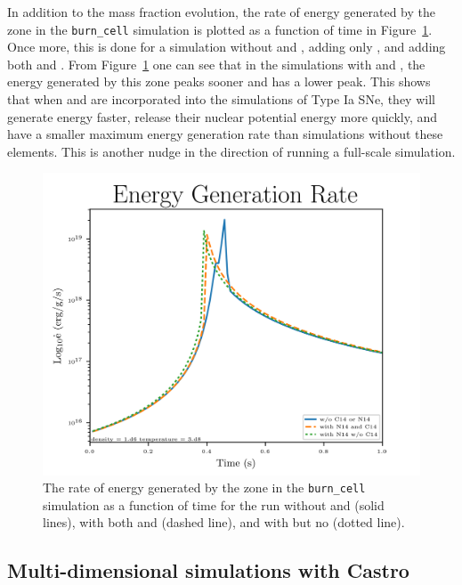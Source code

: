 \documentclass[preprint]{aastex62}
\begin{document}
      In addition to the mass fraction evolution, the rate of energy generated by the zone in the {\tt burn\_cell} simulation is plotted as a function of time in Figure~\ref{fig:energygeneration}. Once more, this is done for a simulation without  and , adding only , and adding both  and . From Figure~\ref{fig:energygeneration} one can see that in the simulations with  and , the energy generated by this zone peaks sooner and has a lower peak.  This shows that when  and  are incorporated into the simulations of Type Ia SNe, they will generate energy faster, release their nuclear potential energy more quickly, and have a smaller maximum energy generation rate than simulations without these elements. This is another nudge in the direction of running a full-scale simulation. 
      
      \begin{figure}
        \centering
        \includegraphics[width=4.5in]{images/subch_nC14nN14_edot_tol-10.png}
        \caption{The rate of energy generated by the zone in the {\tt burn\_cell} simulation as a function of time for the run without  and  (solid lines), with both  and  (dashed line), and with  but no  (dotted line).
          }
        \label{fig:energygeneration}
      \end{figure} 

  
  \subsection{Multi-dimensional simulations with Castro}
  
\end{document}
